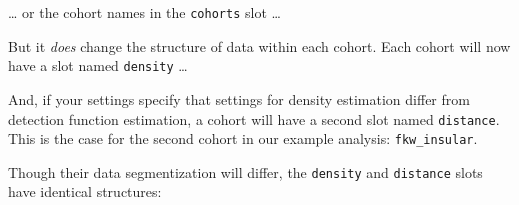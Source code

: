 \documentclass[
]{book}
\newenvironment{Shaded}{\begin{snugshade}}{\end{snugshade}}
\newcommand{\DecValTok}[1]{\textcolor[rgb]{0.00,0.00,0.81}{#1}}
\newcommand{\NormalTok}[1]{#1}
\newcommand{\OperatorTok}[1]{\textcolor[rgb]{0.81,0.36,0.00}{\textbf{#1}}}
\newcommand{\StringTok}[1]{\textcolor[rgb]{0.31,0.60,0.02}{#1}}
\begin{document}
\ldots{} or the cohort names in the \texttt{cohorts} slot \ldots{}

\begin{Shaded}
\end{Shaded}

But it \emph{does} change the structure of data within each cohort. Each cohort will now have a slot named \texttt{density} \ldots{}

\begin{Shaded}
\end{Shaded}

And, if your settings specify that settings for density estimation differ from detection function estimation, a cohort will have a second slot named \texttt{distance}. This is the case for the second cohort in our example analysis: \texttt{fkw\_insular}.

\begin{Shaded}
\end{Shaded}

Though their data segmentization will differ, the \texttt{density} and \texttt{distance} slots have identical structures:

\begin{Shaded}
\end{Shaded}
\end{document}
